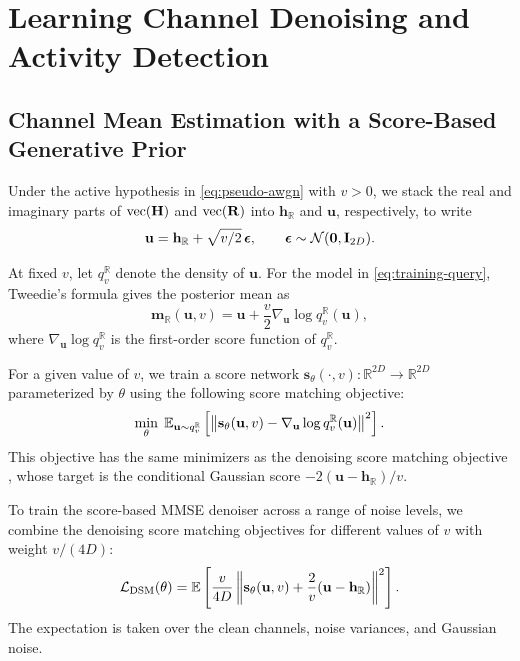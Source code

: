 \section{Learning Channel Denoising and Activity Detection}
\label{sec:learning}

\subsection{Channel Mean Estimation with a Score-Based Generative Prior}
\label{sec:score-denoising}
\label{sec:channel-learning}

Under the active hypothesis in \eqref{eq:pseudo-awgn} with $v>0$,
we stack the real and imaginary parts of $\operatorname{vec}(\mathbf H)$ and $\operatorname{vec}(\mathbf R)$
into $\mathbf h_{\mathbb R}$ and $\mathbf u$, respectively, to write
\begin{equation}
 \mathbf u=\mathbf h_{\mathbb R}+\sqrt{v/2}\,\bm\epsilon,
 \qquad \bm\epsilon\sim\mathcal N(\mathbf0,\mathbf{I}_{2D}).
 \label{eq:training-query}
\end{equation}

At fixed $v$, let $q_v^{\mathbb R}$ denote the density of $\mathbf u$.
For the model in \eqref{eq:training-query}, Tweedie's formula
\cite{efron2011,dytso2023} gives the posterior mean as
\begin{equation}
 \mathbf m_{\mathbb R}(\mathbf u,v)
 =\mathbf u+\frac v2\nabla_{\mathbf u}
       \log q_v^{\mathbb R}(\mathbf u),
 \label{eq:tweedie-mean}
\end{equation}
where $\nabla_{\mathbf u}\log q_v^{\mathbb R}$ is the first-order score
function of $q_v^{\mathbb R}$.

For a given value of $v$, we train a score network
$\mathbf s_\theta(\cdot,v):\mathbb R^{2D}\to\mathbb R^{2D}$
parameterized by $\theta$ using the following score matching objective:
\begin{equation*}
 \min_\theta\;
 \mathbb{E}_{\mathbf u\sim q_v^{\mathbb R}}
 \left[\left\lVert\mathbf s_\theta(\mathbf u,v)
 -\nabla_{\mathbf u}\log q_v^{\mathbb R}(\mathbf u)\right\rVert^2\right].
\end{equation*}
This objective has the same minimizers
as the denoising score matching objective \cite{vincent2011}, whose target is the conditional
Gaussian score $-2(\mathbf u-\mathbf h_{\mathbb R})/v$.

To train the score-based MMSE denoiser across a range of noise levels,
we combine the denoising score matching objectives for different values
of $v$ with weight $v/(4D)$:
\begin{equation}
 \mathcal L_{\rm DSM}(\theta)=
 \mathbb{E}\left[\frac{v}{4D}
 \left\lVert\mathbf s_\theta(\mathbf u,v)
 +\frac2v(\mathbf u-\mathbf h_{\mathbb R})\right\rVert^2\right].
 \label{eq:denoising-score-objective}
\end{equation}
The expectation is taken over the clean channels,
noise variances, and Gaussian noise.

